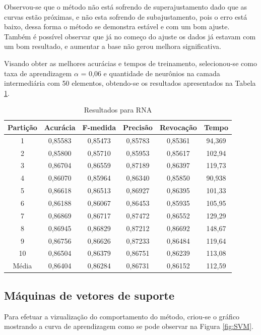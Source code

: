 Observou-se que o método não está sofrendo de superajustamento dado que as curvas estão próximas, e não esta sofrendo de subajustamento, pois o erro está baixo, dessa forma o método se demonstra estável e com um bom ajuste. Também é possível observar que já no começo do ajuste os dados já estavam com um bom resultado, e aumentar a base não gerou melhora significativa.

Visando obter as melhores acurácias e tempos de treinamento, selecionou-se como taxa de aprendizagem \(\alpha\) = 0,06 e quantidade de neurônios na camada intermediária com 50 elementos, obtendo-se os resultados apresentados na Tabela \ref{table:resultadosRNA}.

\begin{table}[h]
\centering
\caption{Resultados para RNA}
\vspace{0.2cm}
\begin{tabular}{c|c|c|c|c|c}
Partição & Acurácia & F-medida & Precisão & Revocação & Tempo \\
\hline
1  & 0,85583 & 0,85473 & 0,85783 & 0,85361 & 94,369 \\
2  & 0,85800 & 0,85710 & 0,85953 & 0,85617 & 102,94 \\
3  & 0,86704 & 0,86559 & 0,87189 & 0,86397 & 119,73 \\
4  & 0,86070 & 0,85964 & 0,86340 & 0,85850 & 90,938 \\
5  & 0,86618 & 0,86513 & 0,86927 & 0,86395 & 101,33 \\
6  & 0,86188 & 0,86067 & 0,86453 & 0,85935 & 105,95 \\
7  & 0,86869 & 0,86717 & 0,87472 & 0,86552 & 129,29 \\
8  & 0,86945 & 0,86829 & 0,87212 & 0,86692 & 148,67 \\
9  & 0,86756 & 0,86626 & 0,87233 & 0,86484 & 119,64 \\
10 & 0,86504 & 0,86379 & 0,86751 & 0,86239 & 113,08 \\
\hline
Média & 0,86404 & 0,86284 & 0,86731 & 0,86152 & 112,59 \\
\end{tabular} 
\label{table:resultadosRNA}
\end{table}

\subsection{Máquinas de vetores de suporte}
	
Para efetuar a vizualização do comportamento do método, criou-se o gráfico mostrando a curva de aprendizagem como se pode observar na Figura \ref{fig:SVM}.

